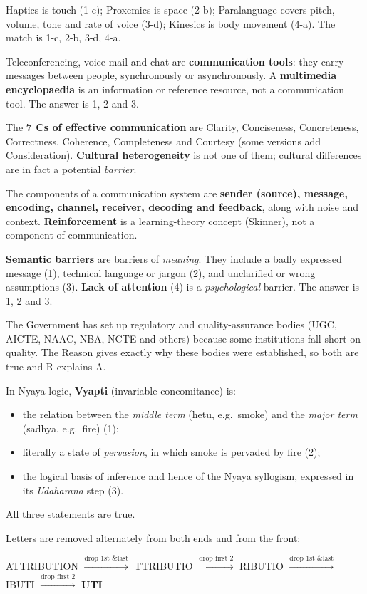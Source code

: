 Haptics is touch (1-c); Proxemics is space (2-b); Paralanguage covers pitch, volume, tone and rate of voice (3-d); Kinesics is body movement (4-a). The match is 1-c, 2-b, 3-d, 4-a.

Teleconferencing, voice mail and chat are \textbf{communication tools}: they carry messages between people, synchronously or asynchronously. A \textbf{multimedia encyclopaedia} is an information or reference resource, not a communication tool. The answer is 1, 2 and 3.

The \textbf{7 Cs of effective communication} are Clarity, Conciseness, Concreteness, Correctness, Coherence, Completeness and Courtesy (some versions add Consideration). \textbf{Cultural heterogeneity} is not one of them; cultural differences are in fact a potential \emph{barrier}.

The components of a communication system are \textbf{sender (source), message, encoding, channel, receiver, decoding and feedback}, along with noise and context. \textbf{Reinforcement} is a learning-theory concept (Skinner), not a component of communication.

\textbf{Semantic barriers} are barriers of \emph{meaning}. They include a badly expressed message (1), technical language or jargon (2), and unclarified or wrong assumptions (3). \textbf{Lack of attention} (4) is a \emph{psychological} barrier. The answer is 1, 2 and 3.

The Government has set up regulatory and quality-assurance bodies (UGC, AICTE, NAAC, NBA, NCTE and others) because some institutions fall short on quality. The Reason gives exactly why these bodies were established, so both are true and R explains A.

In Nyaya logic, \textbf{Vyapti} (invariable concomitance) is:
\begin{itemize}
\item the relation between the \emph{middle term} (hetu, e.g.\ smoke) and the \emph{major term} (sadhya, e.g.\ fire) (1);
\item literally a state of \emph{pervasion}, in which smoke is pervaded by fire (2);
\item the logical basis of inference and hence of the Nyaya syllogism, expressed in its \emph{Udaharana} step (3).
\end{itemize}
All three statements are true.

Letters are removed alternately from both ends and from the front:
\begin{center}
ATTRIBUTION $\xrightarrow{\text{drop 1st \& last}}$ TTRIBUTIO $\xrightarrow{\text{drop first 2}}$ RIBUTIO $\xrightarrow{\text{drop 1st \& last}}$ IBUTI $\xrightarrow{\text{drop first 2}}$ \textbf{UTI}
\end{center}

